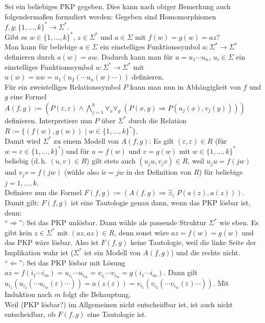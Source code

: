 \begin{Beweis}
    Sei ein beliebiges PKP gegeben.
    Dies kann nach obiger Bemerkung auch folgendermaßen formuliert werden:
    Gegeben sind Homomorphismen $f, g\colon \{1, \dotsc, k\}^\ast \rightarrow \Sigma^\ast$.\\
    Gibt es $w \in \{1, \dotsc, k\}^\ast$, $z \in \Sigma^\ast$ und $a \in \Sigma$ mit
    $f(w) = g(w) = az$?\\
    Man kann für beliebige $a \in \Sigma$ ein einstelliges Funktionssymbol
    $a\colon \Sigma^\ast \rightarrow \Sigma^\ast$ definieren durch $a(w) = aw$.
    Dadurch kann man für $u = u_1 \dotsb u_n$, $u_i \in \Sigma$
    ein einstelliges Funktionssymbol $u\colon \Sigma^\ast \rightarrow \Sigma^\ast$ mit
    $u(w) = uw = u_1(u_2(\dotsb u_n(w) \dotsb))$ definieren.\\
    Für ein zweistelliges Relationssymbol $P$ kann man nun in Abhängigkeit von $f$ und $g$ eine
    Formel $A(f, g) := (P(\varepsilon, \varepsilon) \land
    \bigwedge_{j=1}^k \forall_x \forall_y\; (P(x, y) \Rightarrow P(u_j(x), v_j(y))))$ definieren.
    Interpretiere nun $P$ über $\Sigma^\ast$ durch die Relation
    $R := \{(f(w), g(w)) \;|\; w \in \{1, \dotsc, k\}^\ast\}$.\\
    Damit wird $\Sigma^\ast$ zu einem Modell von $A(f, g)$:
    Es gilt $(\varepsilon, \varepsilon) \in R$ (für $w = \varepsilon \in \{1, \dotsc, k\}^\ast$)
    und für $u = f(w)$ und $v = g(w)$ mit $w \in \{1, \dotsc, k\}^\ast$ beliebig
    (d.\,h. $(u, v) \in R$)
    gilt stets auch $(u_j u, v_j v) \in R$, weil $u_j u = f(j w)$ und $v_j v = f(j w)$
    (wähle also $\widetilde{w} = jw$ in der Definition von $R$)
    für beliebige $j = 1, \dotsc, k$.\\
    Definiere nun die Formel $F(f, g) := (A(f, g) \Rightarrow \exists_z\; P(a(z), a(z)))$.
    Damit gilt: $F(f, g)$ ist eine Tautologie genau dann, wenn das PKP lösbar ist, denn:\\
    "`$\Rightarrow$"':
    Sei das PKP unlösbar.
    Dann wähle als passende Struktur $\Sigma^\ast$ wie eben.
    Es gibt kein $z \in \Sigma^\ast$ mit $(az, az) \in R$, denn sonst wäre
    $az = f(w) = g(w)$ und das PKP wäre lösbar.
    Also ist $F(f, g)$ keine Tautologie, weil die linke Seite der Implikation wahr ist
    ($\Sigma^\ast$ ist ein Modell von $A(f, g)$) und die rechte nicht.\\
    "`$\Leftarrow$"':
    Sei das PKP lösbar mit Lösung
    $az = f(i_1 \dotsb i_m) = u_{i_1} \dotsb u_{i_m} = v_{i_1} \dotsb v_{i_m} = g(i_1 \dotsb i_m)$.
    Dann gilt $u_{i_1}(u_{i_2}(\dotsb u_{i_m}(\varepsilon) \dotsb)) = a(z(\varepsilon)) =
    v_{i_1}(v_{i_2}(\dotsb v_{i_m}(\varepsilon) \dotsb))$.
    Mit Induktion nach $m$ folgt die Behauptung.\\
    Weil (PKP lösbar?) im Allgemeinen nicht entscheidbar ist, ist auch nicht entscheidbar, ob
    $F(f, g)$ eine Tautologie ist.
\end{Beweis}

